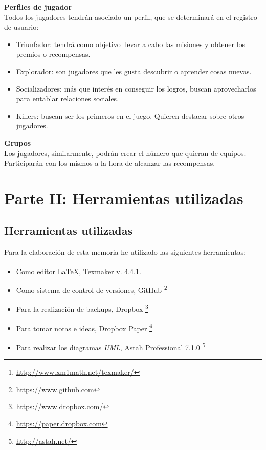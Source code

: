 \documentclass[twoside]{report}
\begin{document}
\textbf{Perfiles de jugador\cite{iebsctj}}\\ 

Todos los jugadores tendrán asociado un perfil, que se determinará en el registro de usuario:
\begin{itemize}

\item Triunfador: tendrá como objetivo llevar a cabo las misiones y obtener los premios o recompensas.
\item Explorador: son jugadores que les gusta descubrir o aprender cosas nuevas.
\item Socializadores: más que interés en conseguir los logros, buscan aprovecharlos para entablar relaciones sociales.
\item Killers: buscan ser los primeros en el juego. Quieren destacar sobre otros jugadores.

\end{itemize}

\textbf{Grupos}\\

Los jugadores, similarmente, podrán crear el número que quieran de equipos. Participarán con los mismos a la hora de alcanzar las recompensas.

\chapter{Parte II: Herramientas utilizadas}
\section{Herramientas utilizadas}

Para la elaboración de esta memoria he utilizado las siguientes herramientas:
\begin{itemize}
\item Como editor \LaTeX , Texmaker v. 4.4.1. \footnote{\url{http://www.xm1math.net/texmaker/}}
\item Como sistema de control de versiones, GitHub \footnote{\url{https://www.github.com}}
\item Para la realización de backups, Dropbox \footnote{\url{https://www.dropbox.com/}}
\item Para tomar notas e ideas, Dropbox Paper \footnote{\url{https://paper.dropbox.com}}
\item Para realizar los diagramas \textit{UML}, Astah Professional 7.1.0  \footnote{\url{http://astah.net/}}
\end{itemize}
\end{document}
